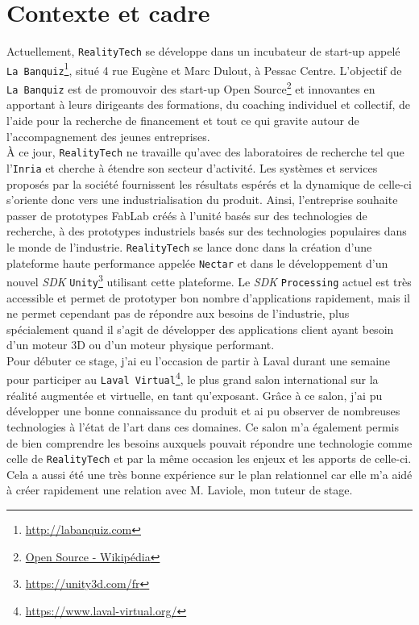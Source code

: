 \section{Contexte et cadre}
\label{sec:contexte}
Actuellement, \texttt{RealityTech} se développe dans un incubateur de start-up appelé \texttt{La Banquiz}\footnote{\href{http://labanquiz.com}{http://labanquiz.com}}, situé 4 rue Eugène et Marc Dulout, à Pessac Centre. L'objectif de \texttt{La Banquiz} est de promouvoir des start-up Open Source\footnote{\href{https://fr.wikipedia.org/wiki/Open\_source}{Open Source - Wikipédia}} et innovantes en apportant à leurs dirigeants des formations, du coaching individuel et collectif, de l'aide pour la recherche de financement et tout ce qui gravite autour de l'accompagnement des jeunes entreprises.\\

À ce jour, \texttt{RealityTech} ne travaille qu'avec des laboratoires de recherche tel que l'\texttt{Inria} et cherche à étendre son secteur d'activité. Les systèmes et services proposés par la société fournissent les résultats espérés et la dynamique de celle-ci s'oriente donc vers une industrialisation du produit. Ainsi, l'entreprise souhaite passer de prototypes FabLab créés à l'unité basés sur des technologies de recherche, à des prototypes industriels basés sur des technologies populaires dans le monde de l'industrie. \texttt{RealityTech} se lance donc dans la création d'une plateforme haute performance appelée \texttt{Nectar} et dans le développement d'un nouvel \emph{SDK} \texttt{Unity}\footnote{\href{https://unity3d.com/fr}{https://unity3d.com/fr}} utilisant cette plateforme. Le \emph{SDK} \texttt{Processing} actuel est très accessible et permet de prototyper bon nombre d'applications rapidement, mais il ne permet cependant pas de répondre aux besoins de l'industrie, plus spécialement quand il s'agit de développer des applications client ayant besoin d'un moteur 3D ou d'un moteur physique performant.\\

Pour débuter ce stage, j'ai eu l'occasion de partir à Laval durant une semaine pour participer au \texttt{Laval Virtual}\footnote{\href{https://www.laval-virtual.org/}{https://www.laval-virtual.org/}}, le plus grand salon international sur la réalité augmentée et virtuelle, en tant qu'exposant. Grâce à ce salon, j'ai pu développer une bonne connaissance du produit et ai pu observer de nombreuses technologies à l'état de l'art dans ces domaines. Ce salon m'a également permis de bien comprendre les besoins auxquels pouvait répondre une technologie comme celle de \texttt{RealityTech} et par la même occasion les enjeux et les apports de celle-ci. Cela a aussi été une très bonne expérience sur le plan relationnel car elle m'a aidé à créer rapidement une relation avec M. Laviole, mon tuteur de stage.

